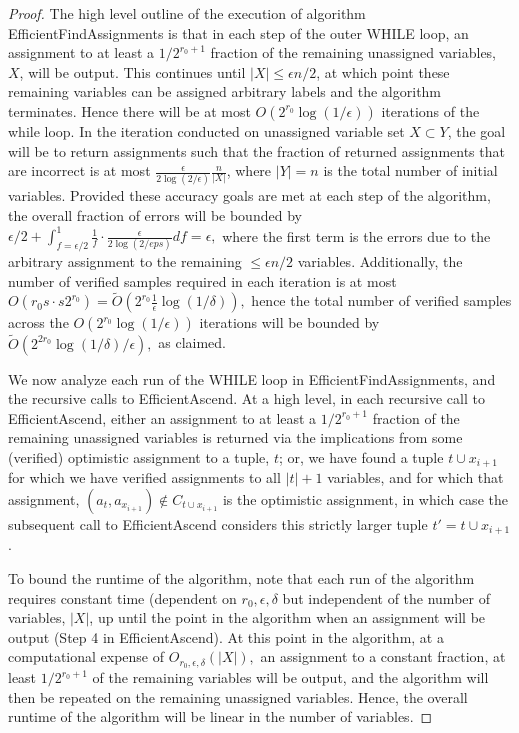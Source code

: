 \documentclass[final,12pt]{colt2018}
\newcommand{\eps}{\epsilon}
\begin{document}
\begin{proof}
The high level outline of the execution of algorithm EfficientFindAssignments is that in each step of the outer WHILE loop, an assignment to at least a $1/2^{r_0+1}$ fraction of the remaining unassigned variables, $X$, will be output.  This continues until $|X| \le \eps n /2$, at which point these remaining variables can be assigned arbitrary labels and the algorithm terminates.  Hence there will be at most $O\left(2^{r_0} \log(1/\eps)\right)$ iterations of the while loop.   In the iteration conducted on unassigned variable set $X \subset Y$, the goal will be to return assignments such that the fraction of returned assignments that are incorrect is at most $\frac{\eps}{2 \log(2/\eps)}\frac{n}{|X|}$, where $|Y|=n$ is the total number of initial variables.   Provided these accuracy goals are met at each step of the algorithm, the overall fraction of errors will be bounded by $\eps/2 + \int_{f=\eps/2}^1 \frac{1}{f} \cdot \frac{\eps}{2 \log(2/eps)} df = \eps,$ where the first term is the errors due to the arbitrary assignment to the remaining $\le \eps n/2$ variables.   Additionally, the number of verified samples required in each iteration is at most $O(r_0s\cdot s 2^{r_0})=\tilde{O}\left(2^{r_0} \frac{1}{\eps}\log(1/\delta)\right),$ hence the total number of verified samples across the $O\left(2^{r_0} \log(1/\eps)\right)$ iterations will be bounded by $\tilde{O}(2^{2r_0} \log(1/\delta)/\eps),$ as claimed.

We now analyze each run of the WHILE loop in EfficientFindAssignments, and the recursive calls to EfficientAscend.   At a high level, in each recursive call to EfficientAscend, either an assignment to at least a $1/2^{r_0+1}$ fraction of the remaining unassigned variables is returned via the implications from some (verified) optimistic assignment to a tuple, $t$; or, we have found a tuple $t \cup x_{i+1}$ for which we have verified assignments to all $|t|+1$ variables, and for which that assignment, $(a_t,a_{x_{i+1}}) \not \in C_{t \cup x_{i+1}}$ is the optimistic assignment, in which case the subsequent call to EfficientAscend considers this strictly larger tuple $t'=t \cup x_{i+1}$.   

To bound the runtime of the algorithm, note that each run of the algorithm requires constant time (dependent on $r_0,\eps,\delta$ but independent of the number of variables, $|X|$, up until the point in the algorithm when an assignment will be output (Step 4 in EfficientAscend).  At this point in the algorithm, at a computational expense of $O_{r_0,\eps,\delta}(|X|),$ an assignment to a constant fraction, at least $1/2^{r_0+1}$ of the remaining variables will be output, and the algorithm will then be repeated on the remaining unassigned variables.   Hence, the overall runtime of the algorithm will be linear in the number of variables.   


\end{proof}
\end{document}
